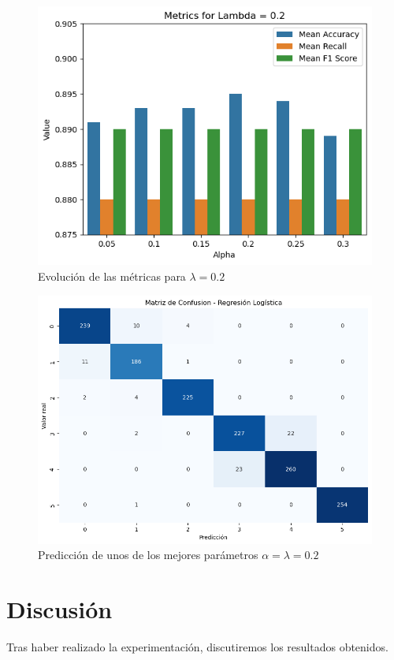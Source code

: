 \documentclass[conference]{IEEEtran}
\begin{document}
\begin{figure}[ht]
    \centering
    \includegraphics[width=1\linewidth]{2.png}
    \caption{Evolución de las métricas para \(\lambda = 0.2\)}
    \label{fig:rlevolution2}
\end{figure}

\begin{figure}[ht]
    \centering
    \includegraphics[width=1\linewidth]{log.png}
    \caption{Predicción de unos de los mejores parámetros \(\alpha = \lambda = 0.2\)}
    \label{fig:reglog}
\end{figure}

\FloatBarrier


\section{Discusión}
Tras haber realizado la experimentación, discutiremos los resultados obtenidos.
\end{document}
